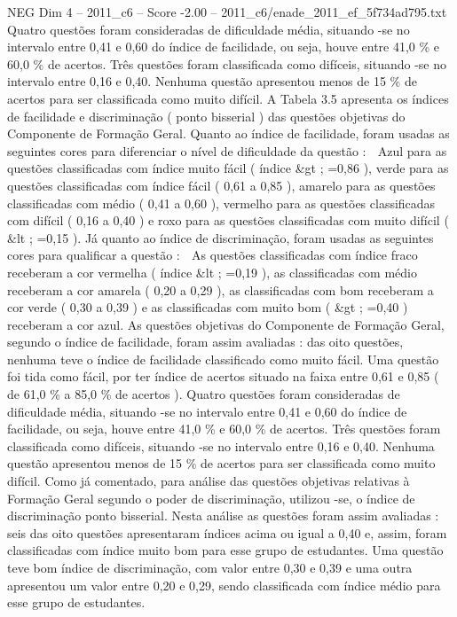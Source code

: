 \begin{textsample}{NEG Dim 4 – 2011\_c6 – Score -2.00 – 2011\_c6/enade\_2011\_ef\_5f734ad795.txt}
Quatro questões foram consideradas de dificuldade média, situando -se no intervalo entre 0,41 e 0,60 do índice de facilidade, ou seja, houve entre 41,0 \% e 60,0 \% de acertos.
Três questões foram classificada como difíceis, situando -se no intervalo entre 0,16 e 0,40.
Nenhuma questão apresentou menos de 15 \% de acertos para ser classificada como muito difícil.
A Tabela 3.5 apresenta os índices de facilidade e discriminação ( ponto bisserial ) das questões objetivas do Componente de Formação Geral.
Quanto ao índice de facilidade, foram usadas as seguintes cores para diferenciar o nível de dificuldade da questão :  Azul para as questões classificadas com índice muito fácil ( índice \&gt ; =0,86 ), verde para as questões classificadas com índice fácil ( 0,61 a 0,85 ), amarelo para as questões classificadas com médio ( 0,41 a 0,60 ), vermelho para as questões classificadas com difícil ( 0,16 a 0,40 ) e roxo para as questões classificadas com muito difícil ( \&lt ; =0,15 ).
Já quanto ao índice de discriminação, foram usadas as seguintes cores para qualificar a questão :  As questões classificadas com índice fraco receberam a cor vermelha ( índice \&lt ; =0,19 ), as classificadas com médio receberam a cor amarela ( 0,20 a 0,29 ), as classificadas com bom receberam a cor verde ( 0,30 a 0,39 ) e as classificadas com muito bom ( \&gt ; =0,40 ) receberam a cor azul.
As questões objetivas do Componente de Formação Geral, segundo o índice de facilidade, foram assim avaliadas : das oito questões, nenhuma teve o índice de facilidade classificado como muito fácil.
Uma questão foi tida como fácil, por ter índice de acertos situado na faixa entre 0,61 e 0,85 ( de 61,0 \% a 85,0 \% de acertos ).
Quatro questões foram consideradas de dificuldade média, situando -se no intervalo entre 0,41 e 0,60 do índice de facilidade, ou seja, houve entre 41,0 \% e 60,0 \% de acertos.
Três questões foram classificada como difíceis, situando -se no intervalo entre 0,16 e 0,40.
Nenhuma questão apresentou menos de 15 \% de acertos para ser classificada como muito difícil.
Como já comentado, para análise das questões objetivas relativas à Formação Geral segundo o poder de discriminação, utilizou -se, o índice de discriminação ponto bisserial.
Nesta análise as questões foram assim avaliadas : seis das oito questões apresentaram índices acima ou igual a 0,40 e, assim, foram classificadas com índice muito bom para esse grupo de estudantes.
Uma questão teve bom índice de discriminação, com valor entre 0,30 e 0,39 e uma outra apresentou um valor entre 0,20 e 0,29, sendo classificada com índice médio para esse grupo de estudantes.

\end{textsample}
